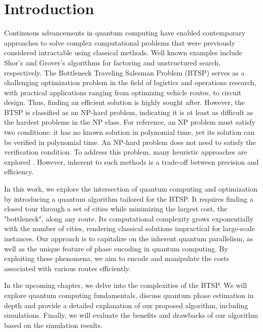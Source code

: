 \documentclass[msc,oneside]{ubcthesis}
\begin{document}
	
	\mainmatter
	
	\chapter{Introduction}

	
	
Continuous advancements in quantum computing have enabled contemporary approaches to solve complex computational problems that were previously considered intractable using classical methods. Well known examples include Shor's \cite{Shor} and Grover's \cite{grover1996fast} algorithms for factoring and unstructured search, respectively. The Bottleneck Traveling Salesman Problem (BTSP) serves as a challenging optimization problem in the field of logistics and operations research, with practical applications ranging from optimizing vehicle routes, to circuit design. Thus, finding an efficient solution is highly sought after. However, the BTSP is classified as an NP-hard problem, indicating it is at least as difficult as the hardest problems in the NP class. For reference, an NP problem must satisfy two conditions: it has no known solution in polynomial time, yet its solution can be verified in polynomial time. An NP-hard problem does not need to satisfy the verification condition. To address this problem, many heuristic approaches are explored \cite{heuristicthesis}\cite{heuristic}. However, inherent to such methods is a trade-off between precision and efficiency.

In this work, we explore the intersection of quantum computing and optimization by introducing a quantum algorithm tailored for the BTSP. It requires finding a closed tour through a set of cities while minimizing the largest cost, the "bottleneck", along any route. Its computational complexity grows exponentially with the number of cities, rendering classical solutions impractical for large-scale instances. Our approach is to capitalize on the inherent quantum parallelism, as well as the unique feature of phase encoding in quantum computing. By exploiting these phenomena, we aim to encode and manipulate the costs associated with various routes efficiently. 

In the upcoming chapter, we delve into the complexities of the BTSP. We will explore quantum computing fundamentals, discuss quantum phase estimation in depth and provide a detailed explanation of our proposed algorithm, including simulations. Finally, we will evaluate the benefits and drawbacks of our algorithm based on the simulation results.
	
\end{document}
